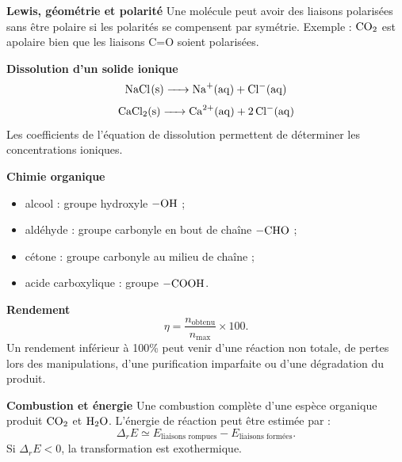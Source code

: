 \documentclass[11pt,a4paper]{article}
\begin{document}
\begin{retenirbox}
\textbf{Lewis, géométrie et polarité}
Une molécule peut avoir des liaisons polarisées sans être polaire si les polarités se compensent par symétrie. Exemple : $\ce{CO2}$ est apolaire bien que les liaisons C=O soient polarisées.
\end{retenirbox}

\begin{retenirbox}
\textbf{Dissolution d'un solide ionique}
\[
\ce{NaCl(s) -> Na+(aq) + Cl-(aq)}
\]
\[
\ce{CaCl2(s) -> Ca^{2+}(aq) + 2Cl-(aq)}
\]
Les coefficients de l'équation de dissolution permettent de déterminer les concentrations ioniques.
\end{retenirbox}

\begin{retenirbox}
\textbf{Chimie organique}
\begin{itemize}
  \item alcool : groupe hydroxyle $-\ce{OH}$ ;
  \item aldéhyde : groupe carbonyle en bout de chaîne $-\ce{CHO}$ ;
  \item cétone : groupe carbonyle au milieu de chaîne ;
  \item acide carboxylique : groupe $-\ce{COOH}$.
\end{itemize}
\end{retenirbox}

\begin{methodbox}
\textbf{Rendement}
\[
\eta=\frac{n_{\text{obtenu}}}{n_{\max}}\times 100.
\]
Un rendement inférieur à 100\% peut venir d'une réaction non totale, de pertes lors des manipulations, d'une purification imparfaite ou d'une dégradation du produit.
\end{methodbox}

\begin{retenirbox}
\textbf{Combustion et énergie}
Une combustion complète d'une espèce organique produit $\ce{CO2}$ et $\ce{H2O}$.
L'énergie de réaction peut être estimée par :
\[
\Delta_rE\simeq E_{\text{liaisons rompues}}-E_{\text{liaisons formées}}.
\]
Si $\Delta_rE<0$, la transformation est exothermique.
\end{retenirbox}
\end{document}
